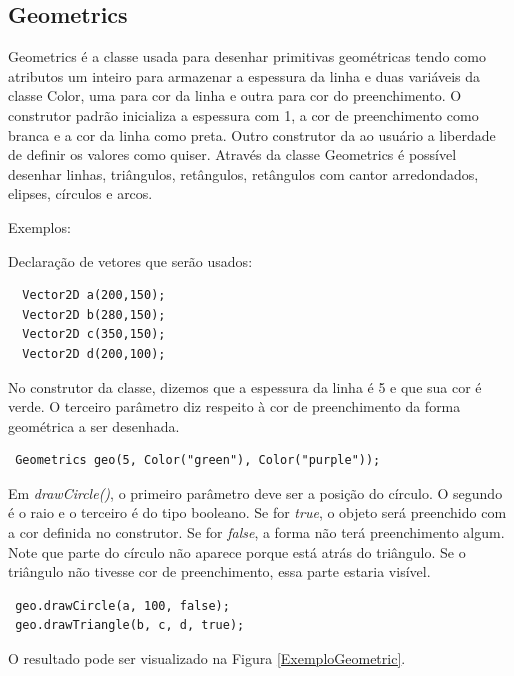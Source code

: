 \subsection{Geometrics}
%
%
Geometrics é a classe usada para desenhar primitivas geométricas tendo como atributos um inteiro para armazenar a espessura da linha e duas variáveis da classe Color, uma para cor da linha e outra para cor do preenchimento. O construtor padrão inicializa a espessura com 1, a cor de preenchimento como branca e a cor da linha como preta. Outro construtor da ao usuário a liberdade de definir os valores como quiser. Através da classe Geometrics é possível desenhar linhas, triângulos, retângulos, retângulos com cantor arredondados, elipses, círculos e arcos. 
\par 
Exemplos: 
\par
Declaração de vetores que serão usados:
%
\begin{lstlisting}
  Vector2D a(200,150);
  Vector2D b(280,150);
  Vector2D c(350,150);
  Vector2D d(200,100);
\end{lstlisting}
%
%
\par 
No construtor da classe, dizemos que a espessura da linha é 5 e que sua cor é verde. O terceiro parâmetro diz respeito à cor de preenchimento da forma geométrica a ser desenhada. 
%
\begin{lstlisting}
 Geometrics geo(5, Color("green"), Color("purple"));
\end{lstlisting}
%
Em \textit{drawCircle()}, o primeiro parâmetro deve ser a posição do círculo. O segundo é o raio e o terceiro é do tipo booleano. Se for \textit{true}, o objeto será preenchido com a cor definida no construtor. Se for \textit{false}, a forma não terá preenchimento algum. Note que parte do círculo não aparece porque está atrás do triângulo. Se o triângulo não tivesse cor de preenchimento, essa parte estaria visível. 
%
\begin{lstlisting}
 geo.drawCircle(a, 100, false);
 geo.drawTriangle(b, c, d, true);
\end{lstlisting}
% 
%
O resultado pode ser visualizado na Figura \ref{ExemploGeometric}.
%
